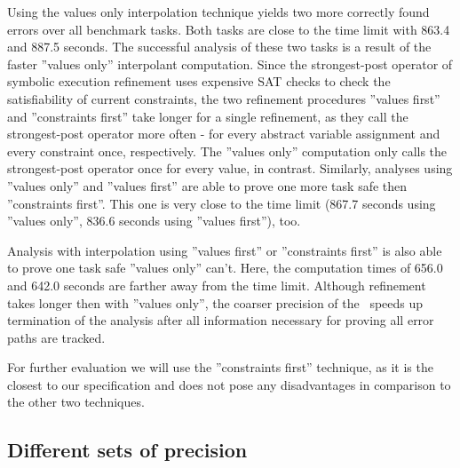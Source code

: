 Using the values only interpolation technique yields two more correctly found errors over all benchmark tasks.
Both tasks are close to the time limit with 863.4 and 887.5 seconds.
The successful analysis of these two tasks is a result of the faster ''values only'' interpolant computation.
Since the strongest-post operator of symbolic execution refinement uses expensive SAT checks to check the satisfiability of current constraints, the two refinement procedures
''values first'' and ''constraints first'' take longer for a single refinement, as they call the strongest-post operator more often - for every abstract variable assignment and every constraint once, respectively.
The ''values only'' computation only calls the strongest-post operator once for every value, in contrast.
Similarly, analyses using ''values only'' and ''values first'' are able to prove one more task safe then ''constraints first''.
This one is very close to the time limit (867.7 seconds using ''values only'', 836.6 seconds using ''values first''), too.

Analysis with interpolation using ''values first'' or ''constraints first'' is also able to prove one task safe ''values only'' can't.
Here, the computation times of 656.0 and 642.0 seconds are farther away from the time limit.
Although refinement takes longer then with ''values only'', the coarser precision of the \constraintsCPA\ speeds up termination of the analysis after all information necessary for proving all error paths are tracked.

For further evaluation we will use the ''constraints first'' technique, as it is the closest to our specification and does not pose any disadvantages in comparison to the other two techniques.

\subsection{Different sets of precision}

